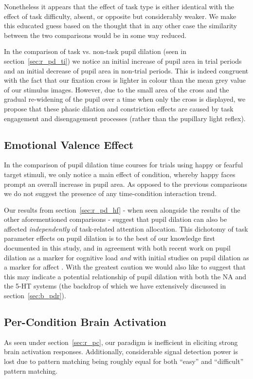 	    Nonetheless it appears that the effect of task type is either identical with the effect of task difficulty, absent, or opposite but considerably weaker.
	    We make this educated guess based on the thought that in any other case the similarity between the two comparisons would be in some way reduced.
	    
	    In the comparison of task vs. non-task pupil dilation (seen in section~\ref{sec:r_pd_ti}) we notice an initial increase of pupil area in trial periods and an initial decrease of pupil area in non-trial periods.
	    This is indeed congruent with the fact that our fixation cross is lighter in colour than the mean grey value of our stimulus images.
	    However, due to the small area of the cross and the gradual re-widening of the pupil over a time when only the cross is displayed, we propose that these phasic dilation and constriction effects are caused by task engagement and disengagement processes (rather than the pupillary light reflex).
	\subsection{Emotional Valence Effect}
	    In the comparison of pupil dilation time courses for trials using happy or fearful target stimuli, we only notice a main effect of condition, whereby happy faces prompt an overall increase in pupil area. 
	    As opposed to the previous comparisons we do not suggest the presence of any time-condition interaction trend.
	    
	    Our results from section~\ref{sec:r_pd_hf} - when seen alongside the results of the other aforementioned comparisons - suggest that pupil dilation can also be affected \textit{independently} of task-related attention allocation.
	    This dichotomy of task parameter effects on pupil dilation is to the best of our knowledge first documented in this study, and in agreement with both recent work on pupil dilation as a marker for cognitive load \textit{and} with initial studies on pupil dilation as a marker for affect \citep{Nunally1967, Bradshaw1967}.
	    With the greatest caution we would also like to suggest that this may indicate a potential relationship of pupil dilation with both the NA and the 5-HT systems (the backdrop of which we have extensively discussed in section~\ref{sec:b_pdr}).
	\subsection{Per-Condition Brain Activation}
	    As seen under section~\ref{sec:r_pc}, our paradigm is inefficient in eliciting strong brain activation responses.
	    Additionally, considerable signal detection power is lost due to pattern matching being roughly equal for both “easy” and “difficult” pattern matching.
	    
